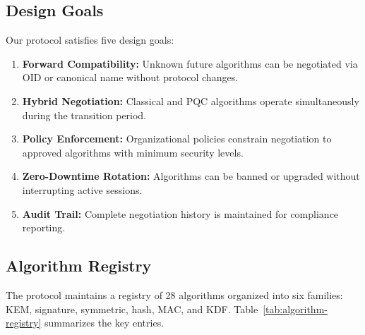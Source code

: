 \documentclass[conference,10pt]{IEEEtran}
\begin{document}
\subsection{Design Goals}

Our protocol satisfies five design goals:

\begin{enumerate}[leftmargin=*, label=\textbf{G\arabic*.}]
\item \textbf{Forward Compatibility:} Unknown future algorithms can be
  negotiated via OID or canonical name without protocol changes.
\item \textbf{Hybrid Negotiation:} Classical and PQC algorithms
  operate simultaneously during the transition period.
\item \textbf{Policy Enforcement:} Organizational policies constrain
  negotiation to approved algorithms with minimum security levels.
\item \textbf{Zero-Downtime Rotation:} Algorithms can be banned or
  upgraded without interrupting active sessions.
\item \textbf{Audit Trail:} Complete negotiation history is maintained
  for compliance reporting.
\end{enumerate}

\subsection{Algorithm Registry}

The protocol maintains a registry of 28 algorithms organized into six
families: KEM, signature, symmetric, hash, MAC, and KDF.
Table~\ref{tab:algorithm-registry} summarizes the key entries.
\end{document}
